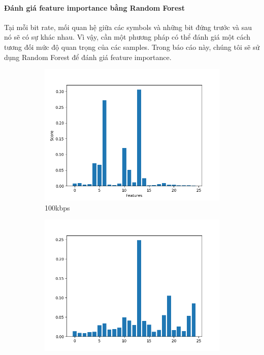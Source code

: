 \paragraph{Đánh giá feature importance bằng Random Forest}
Tại mỗi bit rate, mối quan hệ giữa các symbols và những bit đứng trước và sau nó sẽ có sự khác nhau. Vì vậy, cần một phương pháp có thể đánh giá một cách tương đối mức độ quan trọng của các samples. Trong báo cáo này, chúng tôi sẽ sử dụng Random Forest để đánh giá feature importance.
\begin{figure}
     \centering
     \begin{subfigure}[b]{0.45\textwidth}
         \centering
         \includegraphics[width=\textwidth]{Image/feature_importance_100k}
         \caption{100kbps}
     \end{subfigure}
     \hfill
     \begin{subfigure}[b]{0.45\textwidth}
         \centering
         \includegraphics[width=\textwidth]{Image/feature_importance_150k}

\end{subfigure}
\end{figure}
